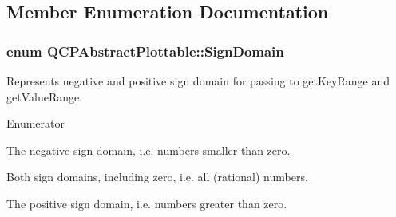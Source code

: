 \subsection{Member Enumeration Documentation}
\hypertarget{classQCPAbstractPlottable_a661743478a1d3c09d28ec2711d7653d8}{
\subsubsection[{Sign\-Domain}]{\setlength{\rightskip}{0pt plus 5cm}enum {\bf Q\-C\-P\-Abstract\-Plottable\-::\-Sign\-Domain}\hspace{0.3cm}{\ttfamily [protected]}}}\label{classQCPAbstractPlottable_a661743478a1d3c09d28ec2711d7653d8}
Represents negative and positive sign domain for passing to get\-Key\-Range and get\-Value\-Range. \begin{Desc}
\item[Enumerator]\par
\begin{description}
\item[{\em 
\hypertarget{classQCPAbstractPlottable_a661743478a1d3c09d28ec2711d7653d8a0fc9a70796ef60ad18ddd18056e6dc63}{sd\-Negative}\label{classQCPAbstractPlottable_a661743478a1d3c09d28ec2711d7653d8a0fc9a70796ef60ad18ddd18056e6dc63}
}]The negative sign domain, i.\-e. numbers smaller than zero. \item[{\em 
\hypertarget{classQCPAbstractPlottable_a661743478a1d3c09d28ec2711d7653d8a082b98cfb91a7363a3b5cd17b0c1cd60}{sd\-Both}\label{classQCPAbstractPlottable_a661743478a1d3c09d28ec2711d7653d8a082b98cfb91a7363a3b5cd17b0c1cd60}
}]Both sign domains, including zero, i.\-e. all (rational) numbers. \item[{\em 
\hypertarget{classQCPAbstractPlottable_a661743478a1d3c09d28ec2711d7653d8a02951859f243a4d24e779cfbb5471030}{sd\-Positive}\label{classQCPAbstractPlottable_a661743478a1d3c09d28ec2711d7653d8a02951859f243a4d24e779cfbb5471030}
}]The positive sign domain, i.\-e. numbers greater than zero. \end{description}
\end{Desc}


